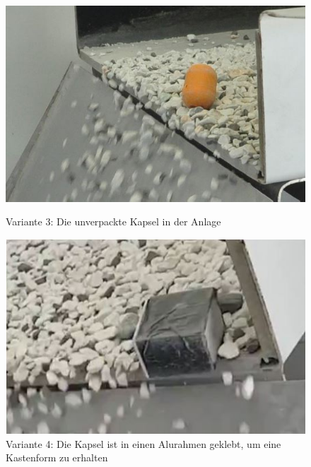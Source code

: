 \begin{figure}[htb]
	\centering
	\begin{minipage}[t]{0.49\linewidth}
		\centering
		\includegraphics[width=1\linewidth]{images/k4-kapsel.JPG}
		\caption{Variante 3: Die unverpackte Kapsel in der Anlage}
		\label{fig:k4_kapsel}
	\end{minipage}%
	\hfill
	\begin{minipage}[t]{0.49\linewidth}
	\centering
	\includegraphics[width=\linewidth]{images/k4-alu.JPG}
	\caption{Variante 4: Die Kapsel ist in einen Alurahmen geklebt, um eine Kastenform zu erhalten}
	\label{fig:k4_alu}
	\end{minipage}
\end{figure}

\begin{figure}[htb]

\end{figure}

